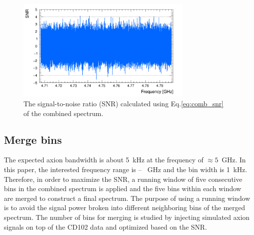\begin{figure}[hbt!]
    \centering
    \includegraphics[width=8.6cm]{figures/SNR_CombSpectrum_AxionRun_AllSteps_Rescan_SG4_W201_LqWeight.png}
    \caption{The signal-to-noise ratio (SNR) calculated using 
Eq.\eqref{eq:comb_snr} of the combined spectrum. }
    \label{fig:SNR_comb}
\end{figure}



\subsection{Merge bins}
\label{sec:merge}

The expected axion bandwidth is about 5~kHz at the frequency of 
$\approx5$~GHz. 
In this paper, the interested frequency range is \flo -- \fhi~GHz and the bin 
width is 1~kHz. Therefore, in order to maximize the SNR, a running window of 
five consecutive bins in the combined spectrum is applied and the five bins 
within each window are merged to construct a final spectrum.  
The purpose of using a running window is to avoid the signal power broken 
into different neighboring bins of the merged spectrum. 
The number of bins for merging is studied by injecting 
simulated axion signals on top of the CD102 data and optimized based 
on the SNR. 

